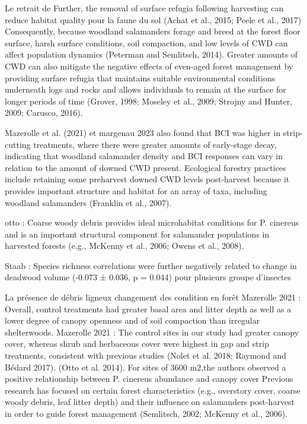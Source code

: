 Le retrait de 
Further, the removal of surface refugia following harvesting can reduce habitat quality pour la faune du sol (Achat et al., 2015; Peele et al., 2017)
Consequently, because woodland salamanders forage and breed at the forest floor surface, harsh surface conditions, soil compaction, and low levels of CWD can affect population dynamics (Peterman and Semlitsch, 2014).
Greater amounts of CWD can also mitigate the negative effects of even-aged forest management by providing surface refugia that maintains suitable environmental conditions underneath logs and rocks and allows individuals to remain at the surface for longer periods of time (Grover, 1998; Moseley et al., 2009; Strojny and Hunter, 2009; Carusco, 2016).

Mazerolle et al. (2021)  et margenau 2023 also found that BCI was higher in strip-cutting treatments, where there were greater amounts of early-stage decay, indicating that woodland salamander density and BCI responses can vary in relation to the amount of downed CWD present.
Ecological forestry practices include retaining some preharvest downed CWD levels post-harvest because it provides important structure and habitat for an array of taxa, including woodland salamanders (Franklin et al., 2007).

otto :
Coarse woody debris provides ideal microhabitat conditions for P. cinereus and is an important structural component for salamander populations in harvested forests (e.g., McKenny et al., 2006; Owens et al., 2008).

Staab :
Species richness correlations were further negatively related to change in deadwood volume (-0.073 ± 0.036, p = 0.044) pour plusieurs groupe d'insectes

La présence de débris ligneux 
changement des condition en forêt
Mazerolle 2021 : Overall, control treatments had greater basal area and litter depth as well as a lower degree of canopy openness and of soil compaction than irregular shelterwoods.
Mazerolle 2021 : The control sites in our study had greater canopy cover, whereas shrub and herbaceous cover were highest in gap and strip treatments, consistent with previous studies (Nolet et al. 2018; Raymond and Bédard 2017).
(Otto et al. 2014). For sites of 3600 m2,the authors observed a positive relationship between P. cinereus abundance and canopy cover 
Previous research has focused on certain forest characteristics (e.g., overstory cover, coarse woody debris, leaf litter depth) and their influence on salamanders post-harvest in order to guide forest management (Semlitsch, 2002; McKenny et al., 2006).


